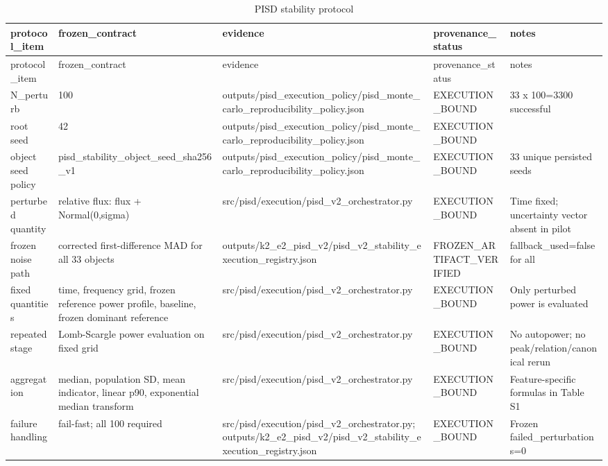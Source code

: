 \begin{longtable}{lllll}
\caption{PISD stability protocol}\\
\toprule
protocol\_item & frozen\_contract & evidence & provenance\_status & notes \\
\midrule
\endfirsthead
\toprule
protocol\_item & frozen\_contract & evidence & provenance\_status & notes \\
\midrule
\endhead
N\_perturb & 100 & outputs/pisd\_execution\_policy/pisd\_monte\_carlo\_reproducibility\_policy.json & EXECUTION\_BOUND & 33 x 100=3300 successful \\
root seed & 42 & outputs/pisd\_execution\_policy/pisd\_monte\_carlo\_reproducibility\_policy.json & EXECUTION\_BOUND &  \\
object seed policy & pisd\_stability\_object\_seed\_sha256\_v1 & outputs/pisd\_execution\_policy/pisd\_monte\_carlo\_reproducibility\_policy.json & EXECUTION\_BOUND & 33 unique persisted seeds \\
perturbed quantity & relative flux: flux + Normal(0,sigma) & src/pisd/execution/pisd\_v2\_orchestrator.py & EXECUTION\_BOUND & Time fixed; uncertainty vector absent in pilot \\
frozen noise path & corrected first-difference MAD for all 33 objects & outputs/k2\_e2\_pisd\_v2/pisd\_v2\_stability\_execution\_registry.json & FROZEN\_ARTIFACT\_VERIFIED & fallback\_used=false for all \\
fixed quantities & time, frequency grid, frozen reference power profile, baseline, frozen dominant reference & src/pisd/execution/pisd\_v2\_orchestrator.py & EXECUTION\_BOUND & Only perturbed power is evaluated \\
repeated stage & Lomb-Scargle power evaluation on fixed grid & src/pisd/execution/pisd\_v2\_orchestrator.py & EXECUTION\_BOUND & No autopower; no peak/relation/canonical rerun \\
aggregation & median, population SD, mean indicator, linear p90, exponential median transform & src/pisd/execution/pisd\_v2\_orchestrator.py & EXECUTION\_BOUND & Feature-specific formulas in Table S1 \\
failure handling & fail-fast; all 100 required & src/pisd/execution/pisd\_v2\_orchestrator.py; outputs/k2\_e2\_pisd\_v2/pisd\_v2\_stability\_execution\_registry.json & EXECUTION\_BOUND & Frozen failed\_perturbations=0 \\
\bottomrule
\end{longtable}
